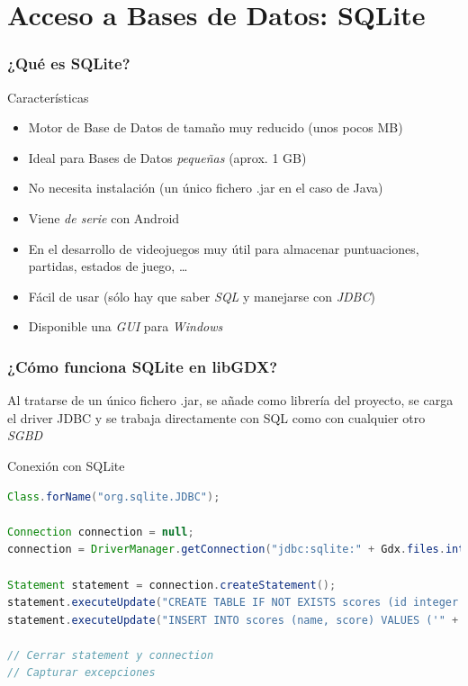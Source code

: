 \documentclass[xcolor={dvipsnames}]{beamer}
\begin{document}
\section{Acceso a Bases de Datos: SQLite}
\begin{frame}\frametitle{¿Qué es SQLite?}
    \begin{block}{Características}
        \begin{itemize}
            \item Motor de Base de Datos de tamaño muy reducido (unos pocos MB)
            \item Ideal para Bases de Datos \emph{pequeñas} (aprox. 1 GB)
            \item No necesita instalación (un único fichero .jar en el caso de Java)
            \item Viene \emph{de serie} con Android
            \item En el desarrollo de videojuegos muy útil para almacenar puntuaciones, partidas, estados de juego, \ldots
            \item Fácil de usar (sólo hay que saber \emph{SQL} y manejarse con \emph{JDBC})
            \item Disponible una \emph{GUI} para \emph{Windows} \href{http://wwww.dondesea.com}{}
        \end{itemize}
    \end{block}
\end{frame}

\begin{frame}[fragile]\frametitle{¿Cómo funciona SQLite en libGDX?}
    Al tratarse de un único fichero .jar, se añade como librería del proyecto, se carga el driver JDBC y se trabaja directamente con SQL
    como con cualquier otro \emph{SGBD}
    \begin{exampleblock}{Conexión con SQLite}
    \begin{lstlisting}[language=java]
Class.forName("org.sqlite.JDBC");		

Connection connection = null;
connection = DriverManager.getConnection("jdbc:sqlite:" + Gdx.files.internal("scores.db"));	

Statement statement = connection.createStatement();
statement.executeUpdate("CREATE TABLE IF NOT EXISTS scores (id integer primary key autoincrement, name text, score int)");
statement.executeUpdate("INSERT INTO scores (name, score) VALUES ('" + name + "', " + score + ")");
	
// Cerrar statement y connection
// Capturar excepciones
    \end{lstlisting}
    \end{exampleblock}
\end{frame}
\end{document}
